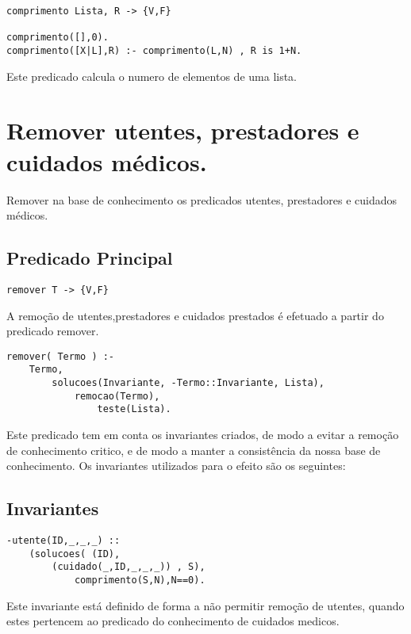 \documentclass{report}
\def\titulo#1{\section{#1}}
\begin{document}
\begin{verbatim}
comprimento Lista, R -> {V,F}

comprimento([],0).
comprimento([X|L],R) :- comprimento(L,N) , R is 1+N.
\end{verbatim}
Este predicado calcula o numero de elementos de uma lista.
\bigbreak





























\titulo{Remover utentes, prestadores e cuidados médicos.}

Remover na base de conhecimento os predicados utentes, prestadores e cuidados médicos. 

\subsection{Predicado Principal}
 
\begin{verbatim}
remover T -> {V,F}
\end{verbatim}
 
A remoção de utentes,prestadores e cuidados prestados é efetuado a partir do predicado remover. 
 

\begin{verbatim}
remover( Termo ) :-
    Termo,
        solucoes(Invariante, -Termo::Invariante, Lista),
            remocao(Termo),
                teste(Lista).
\end{verbatim}

Este predicado tem em conta os invariantes criados, de modo a evitar a remoção de conhecimento critico, e de modo a manter a consistência da nossa base de conhecimento. Os invariantes utilizados para o efeito são os seguintes:    

\subsection{Invariantes}

\begin{verbatim}
-utente(ID,_,_,_) :: 
    (solucoes( (ID), 
        (cuidado(_,ID,_,_,_)) , S),
            comprimento(S,N),N==0).
\end{verbatim}
Este invariante está definido de forma a não permitir remoção de utentes, quando estes pertencem ao predicado do conhecimento de cuidados medicos.
\bigbreak
\end{document}
